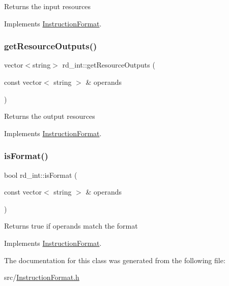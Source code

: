 Returns the input resources 

Implements \hyperlink{classInstructionFormat_a09775d3a3c22f40a0f44504664e586e4}{Instruction\+Format}.

\mbox{\label{classrd__int_a3728611aa3701f90fdaca2e63198ff80}} 
\subsubsection{\texorpdfstring{get\+Resource\+Outputs()}{getResourceOutputs()}}
{\footnotesize\ttfamily vector$<$string$>$ rd\+\_\+int\+::get\+Resource\+Outputs (\begin{DoxyParamCaption}\item[{const vector$<$ string $>$ \&}]{operands }\end{DoxyParamCaption})\hspace{0.3cm}{\ttfamily [virtual]}}

Returns the output resources 

Implements \hyperlink{classInstructionFormat_a95cd28ffb1bde59b67f676880ab10536}{Instruction\+Format}.

\mbox{\label{classrd__int_aded49d47c21e49d1f71a9531d1c600b2}} 
\subsubsection{\texorpdfstring{is\+Format()}{isFormat()}}
{\footnotesize\ttfamily bool rd\+\_\+int\+::is\+Format (\begin{DoxyParamCaption}\item[{const vector$<$ string $>$ \&}]{operands }\end{DoxyParamCaption})\hspace{0.3cm}{\ttfamily [virtual]}}

Returns true if operands match the format 

Implements \hyperlink{classInstructionFormat_a9fdcf94dcd7d9a55ba86e7a63f04d1fe}{Instruction\+Format}.



The documentation for this class was generated from the following file\+:\begin{DoxyCompactItemize}
\item 
src/\hyperlink{InstructionFormat_8h}{Instruction\+Format.\+h}\end{DoxyCompactItemize}
